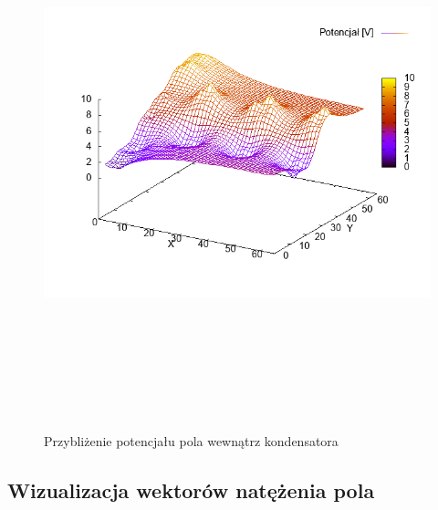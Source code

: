 \documentclass[a4paper,12pt]{article}
\begin{document}
\begin{justify}
\begin{figure}[h]
\centering
\includegraphics[width=18cm, height=16cm]{plotp}
\caption{Przybliżenie potencjału pola wewnątrz kondensatora}
\end{figure}

\subsection{Wizualizacja wektorów natężenia pola}


\end{justify}
\end{document}
